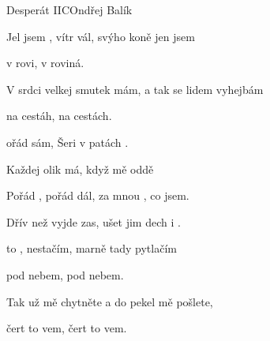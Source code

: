 \begin{song}{Desperát II}{C}{Ondřej Balík}
\begin{SBVerse}
Jel jsem , vítr vál, svýho koně jen jsem 

v rovi, v roviná. 

V srdci velkej smutek mám, a tak se lidem vyhejbám 

na cestáh, na cestách.
\end{SBVerse}
\begin{SBChorus}
 ořád sám, Šeri v patách .

Každej olik má, když mě  oddě

Pořád , pořád dál, za mnou , co jsem.

Dřív než  vyjde zas, ušet jim dech i .
\end{SBChorus}
\begin{SBVerse}
 to , nestačím, marně tady pytlačím

pod nebem, pod nebem. 

Tak už mě chytněte a do pekel mě pošlete,

čert to vem, čert to vem.
\end{SBVerse}
\begin{SBChorus}
\end{SBChorus}
\end{song}
\pagebreak
